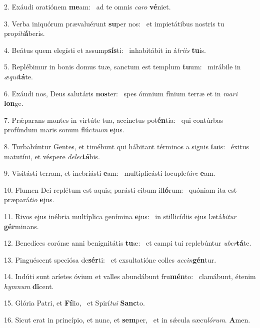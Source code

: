 2. Exáudi oratiónem \textbf{me}am: \ast\  ad te omnis \textit{ca}\textit{ro} \textbf{vé}niet.\

3. Verba iniquórum prævaluérunt \textbf{su}per nos: \ast\  et impietátibus nostris tu pro\textit{pi}\textit{ti}\textbf{á}beris.\

4. Beátus quem elegísti et assump\textbf{sís}ti: \ast\  inhabitábit in á\textit{tri}\textit{is} \textbf{tu}is.\

5. Replébimur in bonis domus tuæ, sanctum est templum \textbf{tu}um: \ast\  mirábile in \textit{æ}\textit{qui}\textbf{tá}te.\

6. Exáudi nos, Deus salutáris \textbf{nos}ter: \ast\  spes ómnium fínium terræ et in \textit{ma}\textit{ri} \textbf{lon}ge.\

7. Prǽparans montes in virtúte tua, accínctus pot\textbf{én}tia: \ast\  qui contúrbas profúndum maris sonum flúc\textit{tu}\textit{um} \textbf{e}jus.\

8. Turbabúntur Gentes, et timébunt qui hábitant términos a signis \textbf{tu}is: \ast\  éxitus matutíni, et véspere \textit{de}\textit{lec}\textbf{tá}bis.\

9. Visitásti terram, et inebriásti \textbf{e}am: \ast\  multiplicásti locuple\textit{tá}\textit{re} \textbf{e}am.\

10. Flumen Dei replétum est aquis; parásti cibum il\textbf{ló}rum: \ast\  quóniam ita est præpará\textit{ti}\textit{o} \textbf{e}jus.\

11. Rivos ejus inébria multíplica genímina \textbf{e}jus: \ast\  in stillicídiis ejus lætá\textit{bi}\textit{tur} \textbf{gér}minans.\

12. Benedíces corónæ anni benignitátis \textbf{tu}æ: \ast\  et campi tui replebúntur \textit{u}\textit{ber}\textbf{tá}te.\

13. Pinguéscent speciósa de\textbf{sér}ti: \ast\  et exsultatióne colles \textit{ac}\textit{cin}\textbf{gén}tur.\

14. Indúti sunt aríetes óvium et valles abundábunt fru\textbf{mén}to: \ast\  clamábunt, étenim \textit{hym}\textit{num} \textbf{di}cent.\

15. Glória Patri, et \textbf{Fí}lio, \ast\  et Spirí\textit{tu}\textit{i} \textbf{Sanc}to.\

16. Sicut erat in princípio, et nunc, et \textbf{sem}per, \ast\  et in sǽcula sæcu\textit{ló}\textit{rum}. \textbf{A}men.\

